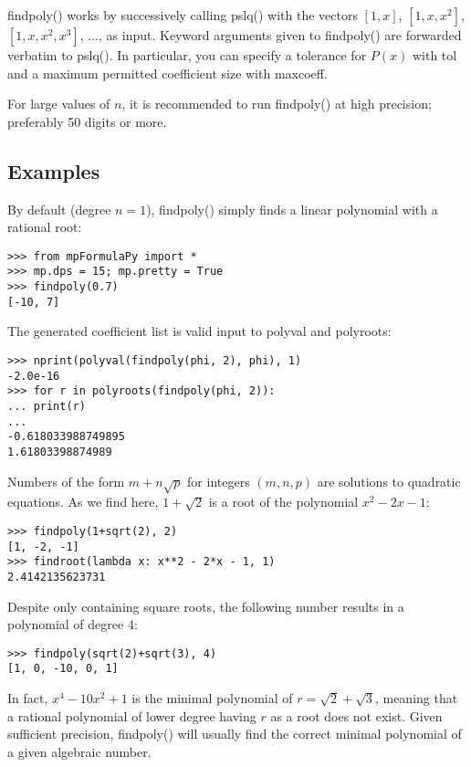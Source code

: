 \vpara
findpoly() works by successively calling pslq() with the vectors $[1,x]$, $[1,x,x^2]$, $[1,x,x^2,x^3]$, ..., as input. Keyword arguments given to findpoly() are forwarded verbatim to pslq(). In particular, you can specify a tolerance for $P(x)$ with tol and a maximum permitted coefficient size with maxcoeff.

For large values of $n$, it is recommended to run findpoly() at high precision; preferably 50 digits or more.


\subsection{Examples}

By default (degree $n=1$), findpoly() simply finds a linear polynomial with a rational root:

\begin{lstlisting}
>>> from mpFormulaPy import *
>>> mp.dps = 15; mp.pretty = True
>>> findpoly(0.7)
[-10, 7]
\end{lstlisting}


The generated coefficient list is valid input to polyval and polyroots:

\begin{lstlisting}
>>> nprint(polyval(findpoly(phi, 2), phi), 1)
-2.0e-16
>>> for r in polyroots(findpoly(phi, 2)):
... print(r)
...
-0.618033988749895
1.61803398874989
\end{lstlisting}


Numbers of the form $m+n\sqrt{p}$ for integers $(m,n,p)$ are solutions to quadratic equations. As we find here, $1+\sqrt{2}$ is a root of the polynomial $x^2-2x-1$:

\begin{lstlisting}
>>> findpoly(1+sqrt(2), 2)
[1, -2, -1]
>>> findroot(lambda x: x**2 - 2*x - 1, 1)
2.4142135623731
\end{lstlisting}


Despite only containing square roots, the following number results in a polynomial of degree 4:

\begin{lstlisting}
>>> findpoly(sqrt(2)+sqrt(3), 4)
[1, 0, -10, 0, 1]
\end{lstlisting}


In fact, $x^4-10x^2+1$ is the minimal polynomial of $r=\sqrt{2}+\sqrt{3}$, meaning that a rational polynomial of lower degree having $r$ as a root does not exist. Given sufficient precision, findpoly() will usually find the correct minimal polynomial of a given algebraic number.



